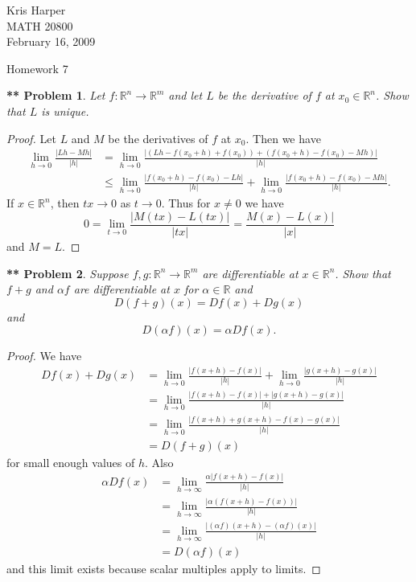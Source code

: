 \documentclass{article}
\newtheorem{**}{** Problem}
\begin{document}
\begin{flushright}
Kris Harper\\

MATH 20800\\

February 16, 2009
\end{flushright}

\begin{center}
Homework 7
\end{center}

\begin{flushleft}

\begin{**}
Let $f : \mathbb{R}^n \rightarrow \mathbb{R}^m$ and let $L$ be the derivative of $f$ at $x_0 \in \mathbb{R}^n$. Show that $L$ is unique.
\end{**}
\begin{proof}
Let $L$ and $M$ be the derivatives of $f$ at $x_0$. Then we have
\begin{align*}
\lim_{h \rightarrow 0} \frac{|Lh - Mh|}{|h|}
&= \lim_{h \rightarrow 0} \frac{|(Lh - f(x_0 + h) + f(x_0)) + (f(x_0 + h) - f(x_0) - Mh)|}{|h|}\\
&\leq \lim_{h \rightarrow 0} \frac{|f(x_0 + h) - f(x_0) - Lh|}{|h|} + \lim_{h \rightarrow 0} \frac{|f(x_0 + h) - f(x_0) - Mh|}{|h|}.
\end{align*}
If $x \in \mathbb{R}^n$, then $tx \rightarrow 0$ as $t \rightarrow 0$. Thus for $x \neq 0$ we have
\[
0 = \lim_{t \rightarrow 0} \frac{|M(tx) - L(tx)|}{|tx|} = \frac{M(x) - L(x)|}{|x|}
\]
and $M = L$.
\end{proof}

\begin{**}
Suppose $f, g : \mathbb{R}^n \rightarrow \mathbb{R}^m$ are differentiable at $x \in \mathbb{R}^n$. Show that $f+g$ and $\alpha f$ are differentiable at $x$ for $\alpha \in \mathbb{R}$ and
\[
D(f+g)(x) = Df(x) + Dg(x)
\]
and
\[
D(\alpha f)(x) = \alpha Df(x).
\]
\end{**}
\begin{proof}
We have
\begin{align*}
Df(x) + Dg(x)
&= \lim_{h \rightarrow 0} \frac{|f(x + h) - f(x)|}{|h|} + \lim_{h \rightarrow 0} \frac{|g(x + h) - g(x)|}{|h|}\\
&= \lim_{h \rightarrow 0} \frac{|f(x + h) - f(x)| + |g(x+h) - g(x)|}{|h|}\\
&= \lim_{h \rightarrow 0} \frac{|f(x+h) + g(x+ h) - f(x) - g(x)|}{|h|}\\
&= D(f+g)(x)
\end{align*}
for small enough values of $h$. Also
\begin{align*}
\alpha Df(x)
&= \lim_{h \rightarrow \infty} \frac{\alpha |f(x+h) - f(x)|}{|h|}\\
&= \lim_{h \rightarrow \infty} \frac{|\alpha (f(x+h) - f(x))|}{|h|}\\
&= \lim_{h \rightarrow \infty} \frac{|(\alpha f)(x+h) - (\alpha f)(x)|}{|h|}\\
&= D(\alpha f)(x)
\end{align*}
and this limit exists because scalar multiples apply to limits.
\end{proof}


\end{flushleft}
\end{document}

